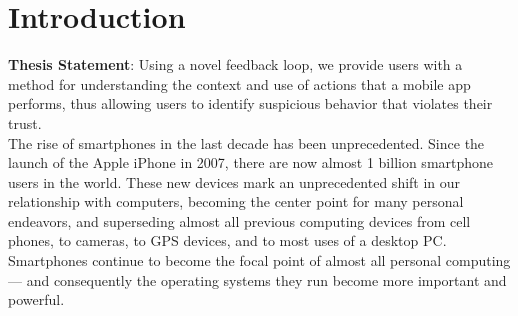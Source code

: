 \chapter{Introduction}
\label{sec:intro}

\textbf{Thesis Statement}: Using a novel feedback loop, we provide users with a method for understanding the context and use of actions that a mobile app performs, thus allowing users to identify suspicious behavior that violates their trust.\\


The rise of smartphones in the last decade has been unprecedented. Since the launch of the Apple iPhone in 2007, there are now almost 1 billion smartphone users in the world\citep{kpcbinternetreport2012}. These new devices mark an unprecedented shift in our relationship with computers, becoming the center point for many personal endeavors, and superseding almost all previous computing devices from cell phones, to cameras, to GPS devices, and to most uses of a desktop PC\citep{hua2012introduction}. Smartphones continue to become the focal point of almost all personal computing --- and consequently the operating systems they run become more important and powerful.

